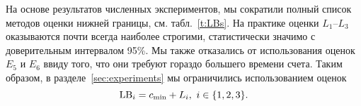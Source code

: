 \begin{table}[h!]

\centering
	\scriptsize
    \caption{Нижние границы}\label{t:LBs}
   \quad
\end{table}

На основе результатов численных экспериментов,
мы сократили полный список методов оценки нижней границы,
см. табл.~\ref{t:LBs}.
На практике оценки 
$L_1$--$L_3$
оказываются почти всегда наиболее строгими,
статистически значимо
с доверительным интервалом 95\%.
Мы также отказались от использования оценок
$E_5$ и $E_6$
ввиду того,
что они требуют гораздо большего времени счета.
Таким образом, 
в разделе~\ref{sec:experiments}
мы ограничились использованием оценок
\[
	\mathrm{LB}_i = c_{\min} + L_i,\ i\in\{1,2,3\}.
\]    

